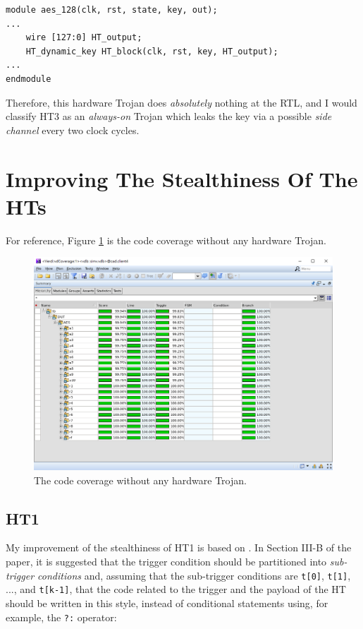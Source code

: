 \documentclass{article}
\begin{document}
\begin{verbatim}
module aes_128(clk, rst, state, key, out);
...
    wire [127:0] HT_output;
    HT_dynamic_key HT_block(clk, rst, key, HT_output);
...
endmodule
\end{verbatim}

Therefore, this hardware Trojan does \textit{absolutely} nothing at the RTL, and I would classify HT3 as an \textit{always-on} Trojan which leaks the key via a possible \textit{side channel} every two clock cycles.

\section{Improving The Stealthiness Of The HTs}

For reference, Figure \ref{nHT123} is the code coverage without any hardware Trojan.

\begin{figure}[htp] \centering
\includegraphics[width=\textwidth]{nHT123}
\caption{The code coverage without any hardware Trojan.}
\label{nHT123}
\end{figure}

\subsection{HT1}

My improvement of the stealthiness of HT1 is based on \cite{6581574}. In Section III-B of the paper, it is suggested that the trigger condition should be partitioned into \textit{sub-trigger conditions} and, assuming that the sub-trigger conditions are \verb|t[0]|, \verb|t[1]|, ..., and \verb|t[k-1]|, that the code related to the trigger and the payload of the HT should be written in this style, instead of conditional statements using, for example, the \verb|?:| operator:
\end{document}
